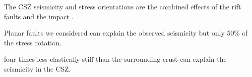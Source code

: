 \documentclass[draft]{agujournal2018}
\begin{document}




\begin{keypoints}
  
  \item The CSZ seismicity and stress orientations are the combined effects of the rift faults and the impact .

  \item Planar faults we considered can explain the observed seismicity but only 50$\%$ of the stress rotation.

  \item {} four times less elastically stiff than the surrounding crust can explain the seismicity in the CSZ.
  
\end{keypoints}

%
%

\end{document}
